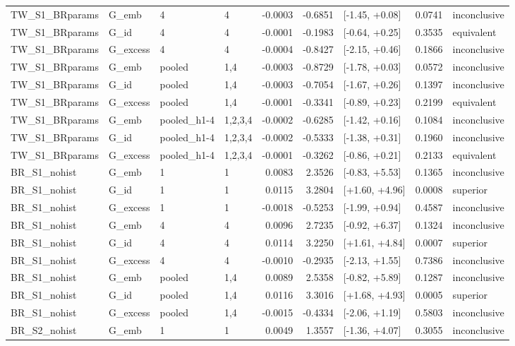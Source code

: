 \begin{tabular}{llllrrlrl}
TW\_S1\_BRparams & G\_emb & 4 & 4 & -0.0003 & -0.6851 & [-1.45, +0.08] & 0.0741 & inconclusive \\
TW\_S1\_BRparams & G\_id & 4 & 4 & -0.0001 & -0.1983 & [-0.64, +0.25] & 0.3535 & equivalent \\
TW\_S1\_BRparams & G\_excess & 4 & 4 & -0.0004 & -0.8427 & [-2.15, +0.46] & 0.1866 & inconclusive \\
TW\_S1\_BRparams & G\_emb & pooled & 1,4 & -0.0003 & -0.8729 & [-1.78, +0.03] & 0.0572 & inconclusive \\
TW\_S1\_BRparams & G\_id & pooled & 1,4 & -0.0003 & -0.7054 & [-1.67, +0.26] & 0.1397 & inconclusive \\
TW\_S1\_BRparams & G\_excess & pooled & 1,4 & -0.0001 & -0.3341 & [-0.89, +0.23] & 0.2199 & equivalent \\
TW\_S1\_BRparams & G\_emb & pooled\_h1-4 & 1,2,3,4 & -0.0002 & -0.6285 & [-1.42, +0.16] & 0.1084 & inconclusive \\
TW\_S1\_BRparams & G\_id & pooled\_h1-4 & 1,2,3,4 & -0.0002 & -0.5333 & [-1.38, +0.31] & 0.1960 & inconclusive \\
TW\_S1\_BRparams & G\_excess & pooled\_h1-4 & 1,2,3,4 & -0.0001 & -0.3262 & [-0.86, +0.21] & 0.2133 & equivalent \\
BR\_S1\_nohist & G\_emb & 1 & 1 & 0.0083 & 2.3526 & [-0.83, +5.53] & 0.1365 & inconclusive \\
BR\_S1\_nohist & G\_id & 1 & 1 & 0.0115 & 3.2804 & [+1.60, +4.96] & 0.0008 & superior \\
BR\_S1\_nohist & G\_excess & 1 & 1 & -0.0018 & -0.5253 & [-1.99, +0.94] & 0.4587 & inconclusive \\
BR\_S1\_nohist & G\_emb & 4 & 4 & 0.0096 & 2.7235 & [-0.92, +6.37] & 0.1324 & inconclusive \\
BR\_S1\_nohist & G\_id & 4 & 4 & 0.0114 & 3.2250 & [+1.61, +4.84] & 0.0007 & superior \\
BR\_S1\_nohist & G\_excess & 4 & 4 & -0.0010 & -0.2935 & [-2.13, +1.55] & 0.7386 & inconclusive \\
BR\_S1\_nohist & G\_emb & pooled & 1,4 & 0.0089 & 2.5358 & [-0.82, +5.89] & 0.1287 & inconclusive \\
BR\_S1\_nohist & G\_id & pooled & 1,4 & 0.0116 & 3.3016 & [+1.68, +4.93] & 0.0005 & superior \\
BR\_S1\_nohist & G\_excess & pooled & 1,4 & -0.0015 & -0.4334 & [-2.06, +1.19] & 0.5803 & inconclusive \\
BR\_S2\_nohist & G\_emb & 1 & 1 & 0.0049 & 1.3557 & [-1.36, +4.07] & 0.3055 & inconclusive \\

\end{tabular}
